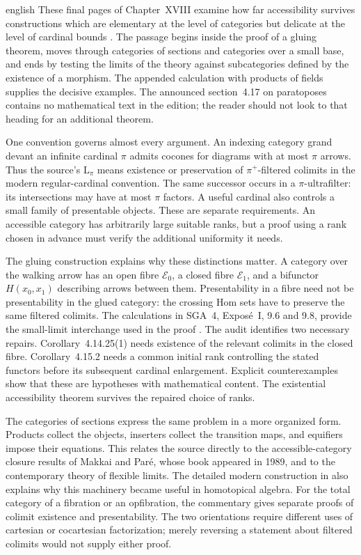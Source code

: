 \begin{otherlanguage*}{english}
These final pages of Chapter~XVIII examine how far accessibility survives constructions which are elementary at the level of categories but delicate at the level of cardinal bounds \citep{Grothendieck1990XVIII}. The passage begins inside the proof of a gluing theorem, moves through categories of sections and categories over a small base, and ends by testing the limits of the theory against subcategories defined by the existence of a morphism. The appended calculation with products of fields supplies the decisive examples. The announced section~4.17 on paratoposes contains no mathematical text in the edition; the reader should not look to that heading for an additional theorem.

One convention governs almost every argument. An indexing category grand devant an infinite cardinal $\pi$ admits cocones for diagrams with at most $\pi$ arrows. Thus the source's $\mathrm L_\pi$ means existence or preservation of $\pi^+$-filtered colimits in the modern regular-cardinal convention. The same successor occurs in a $\pi$-ultrafilter: its intersections may have at most $\pi$ factors. A useful cardinal also controls a small family of presentable objects. These are separate requirements. An accessible category has arbitrarily large suitable ranks, but a proof using a rank chosen in advance must verify the additional uniformity it needs.

The gluing construction explains why these distinctions matter. A category over the walking arrow has an open fibre $\mathcal E_0$, a closed fibre $\mathcal E_1$, and a bifunctor $H(x_0,x_1)$ describing arrows between them. Presentability in a fibre need not be presentability in the glued category: the crossing Hom sets have to preserve the same filtered colimits. The calculations in SGA~4, Expos\'e~I, 9.6 and 9.8, provide the small-limit interchange used in the proof \citep{SGA4I1972}. The audit identifies two necessary repairs. Corollary~4.14.25(1) needs existence of the relevant colimits in the closed fibre. Corollary~4.15.2 needs a common initial rank controlling the stated functors before its subsequent cardinal enlargement. Explicit counterexamples show that these are hypotheses with mathematical content. The existential accessibility theorem survives the repaired choice of ranks.

The categories of sections express the same problem in a more organized form. Products collect the objects, inserters collect the transition maps, and equifiers impose their equations. This relates the source directly to the accessible-category closure results of Makkai and Par\'e, whose book appeared in 1989, and to the contemporary theory of flexible limits. The detailed modern construction in \citet[Appendix~A]{ChingRiehl2014} also explains why this machinery became useful in homotopical algebra. For the total category of a fibration or an opfibration, the commentary gives separate proofs of colimit existence and presentability. The two orientations require different uses of cartesian or cocartesian factorization; merely reversing a statement about filtered colimits would not supply either proof.


\end{otherlanguage*}
